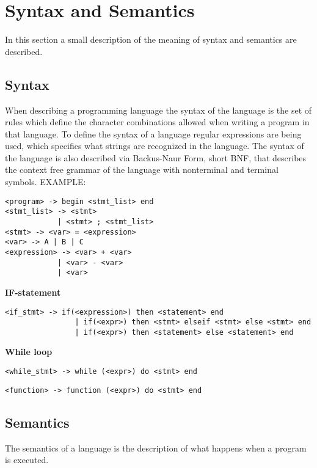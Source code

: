 \section{Syntax and Semantics}
In this section a small description of the meaning of syntax and semantics are described.

\subsection{Syntax}
When describing a programming language the syntax of the language is the set of rules which define the character combinations allowed when writing a program in that language. To define the syntax of a language regular expressions are being used, which specifies what strings are recognized in the language. The syntax of the language is also described via Backus-Naur Form, short BNF, that describes the context free grammar of the language with nonterminal and terminal symbols.
EXAMPLE: \\
\begin{lstlisting}
<program> -> begin <stmt_list> end
<stmt_list> -> <stmt>
			| <stmt> ; <stmt_list>
<stmt> -> <var> = <expression>
<var> -> A | B | C
<expression> -> <var> + <var>
			| <var> - <var>
			| <var>
\end{lstlisting}

\textbf{IF-statement}
\begin{lstlisting}
<if_stmt> -> if(<expression>) then <statement> end
				| if(<expr>) then <stmt> elseif <stmt> else <stmt> end
				| if(<expr>) then <statement> else <statement> end
\end{lstlisting}

\textbf{While loop}
\begin{lstlisting}
<while_stmt> -> while (<expr>) do <stmt> end
\end{lstlisting}

\begin{lstlisting}
<function> -> function (<expr>) do <stmt> end
\end{lstlisting}

\subsection{Semantics}
The semantics of a language is the description of what happens when a program is executed.